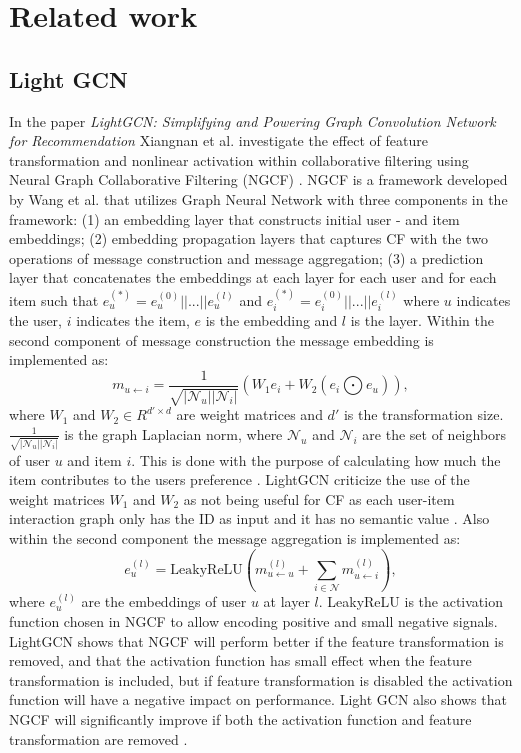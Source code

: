 \section{Related work}

\subsection{Light GCN}
In the paper \textit{LightGCN: Simplifying and Powering Graph Convolution Network for Recommendation} Xiangnan et al. investigate the effect of feature transformation and nonlinear activation within collaborative filtering using Neural Graph Collaborative Filtering (NGCF) \cite{lightgcn}.
NGCF is a framework developed by Wang et al. \cite{NGCF_2019} that utilizes Graph Neural Network with three components in the framework: (1) an embedding layer that constructs initial user - and item embeddings; (2) embedding propagation layers that captures CF with the two operations of message construction and message aggregation; (3) a prediction layer that concatenates the embeddings at each layer for each user and for each item such that $e_{u}^{(*)} = e_{u}^{(0)}||...||e_{u}^{(l)}$ and $e_{i}^{(*)} = e_{i}^{(0)}||...||e_{i}^{(l)}$ where $u$ indicates the user, $i$ indicates the item, $e$ is the embedding and $l$ is the layer.
Within the second component of message construction the message embedding is implemented as:
\begin{equation}
    m_{u \leftarrow i} = \frac{1}{\sqrt{|\mathcal{N}_u||\mathcal{N}_i|}}(W_1e_i + W_2(e_i \bigodot e_u)),
    \label{eq:message-construction}
\end{equation}
where $W_1$ and $W_2 \in R^{d' \times d}$ are weight matrices and $d'$ is the transformation size.
$\frac{1}{\sqrt{|\mathcal{N}_u||\mathcal{N}_i|}}$ is the graph Laplacian norm, where $\mathcal{N}_u$ and $\mathcal{N}_i$ are the set of neighbors of user $u$ and item $i$.
This is done with the purpose of calculating how much the item contributes to the users preference \cite{NGCF_2019}.
LightGCN criticize the use of the weight matrices $W_1$ and $W_2$ as not being useful for CF as each user-item interaction graph only has the ID as input and it has no semantic value \cite{lightgcn}.
Also within the second component the message aggregation is implemented as:
\begin{equation}
    e_{u}^{(l)} = \mbox{LeakyReLU}(m^{(l)}_{u \leftarrow u} + \sum^{}_{i \in \mathcal{N}} m^{(l)}_{u \leftarrow i}),
\end{equation}
where $e_{u}^{(l)}$ are the embeddings of user $u$ at layer $l$.
LeakyReLU is the activation function chosen in NGCF to allow encoding positive and small negative signals.
LightGCN shows that NGCF will perform better if the feature transformation is removed, and that the activation function has small effect when the feature transformation is included, but if feature transformation is disabled the activation function will have a negative impact on performance.
Light GCN also shows that NGCF will significantly improve if both the activation function and feature transformation are removed \cite{lightgcn}.

